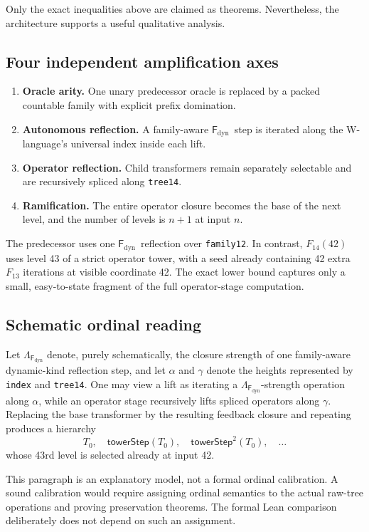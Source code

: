 \documentclass[11pt]{article}
\theoremstyle{definition}
\newcommand{\Fd}{\ensuremath{\mathsf{F}_{\mathrm{dyn}}}}
\newcommand{\lean}[1]{\texttt{#1}}
\newcommand{\step}{\ensuremath{\mathsf{towerStep}}}
\begin{document}
Only the exact inequalities above are claimed as theorems.  Nevertheless, the
architecture supports a useful qualitative analysis.

\subsection{Four independent amplification axes}

\begin{enumerate}[label=\textbf{A\arabic*.},leftmargin=3.2em]
  \item \textbf{Oracle arity.}  One unary predecessor oracle is replaced by a
        packed countable family with explicit prefix domination.
  \item \textbf{Autonomous reflection.}  A family-aware \Fd\ step is iterated
        along the W-language's universal index inside each lift.
  \item \textbf{Operator reflection.}  Child transformers remain separately
        selectable and are recursively spliced along \lean{tree14}.
  \item \textbf{Ramification.}  The entire operator closure becomes the base
        of the next level, and the number of levels is $n+1$ at input $n$.
\end{enumerate}

The predecessor uses one \Fd\ reflection over \lean{family12}.  In contrast,
$F_{14}(42)$ uses level 43 of a strict operator tower, with a seed already
containing 42 extra $F_{13}$ iterations at visible coordinate 42.  The exact
lower bound captures only a small, easy-to-state fragment of the full
operator-stage computation.

\subsection{Schematic ordinal reading}
Let $\Lambda_{\Fd}$ denote, purely schematically, the closure strength of one
family-aware dynamic-kind reflection step, and let $\alpha$ and $\gamma$ denote
the heights represented by \lean{index} and \lean{tree14}.  One may view a
lift as iterating a $\Lambda_{\Fd}$-strength operation along $\alpha$, while an
operator stage recursively lifts spliced operators along $\gamma$.  Replacing
the base transformer by the resulting feedback closure and repeating produces
a hierarchy
\[
  T_0,\quad \step(T_0),\quad \step^2(T_0),\quad\ldots
\]
whose 43rd level is selected already at input 42.

This paragraph is an explanatory model, not a formal ordinal calibration.  A
sound calibration would require assigning ordinal semantics to the actual
raw-tree operations and proving preservation theorems.  The formal Lean
comparison deliberately does not depend on such an assignment.
\end{document}
